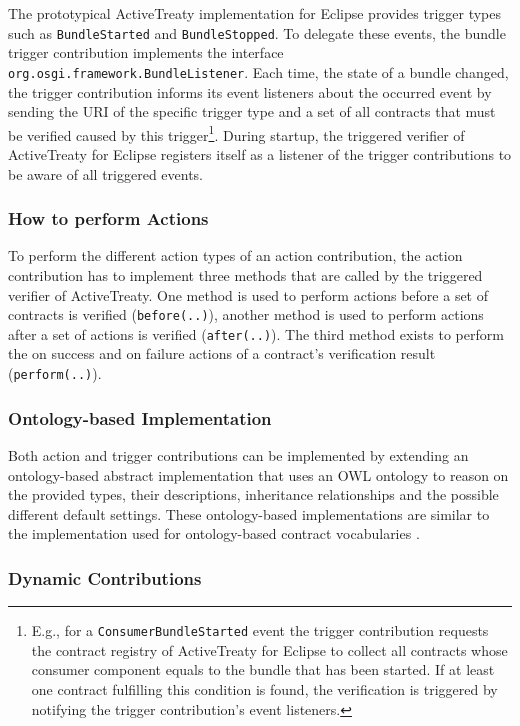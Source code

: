 \documentclass{llncs}
\begin{document}
The prototypical ActiveTreaty implementation for Eclipse provides trigger types such as \texttt{BundleStarted} and \texttt{BundleStopped}. To delegate these events, the bundle trigger contribution implements the interface \texttt{org.osgi.framework.Bun\-dle\-Lis\-te\-ner}. Each time, the state of a bundle changed, the trigger contribution informs its event listeners about the occurred event by sending the URI of the specific trigger type and a set of all contracts that must be verified caused by this trigger\footnote{E.g., for a \texttt{ConsumerBundleStarted} event the trigger contribution requests the contract registry of ActiveTreaty for Eclipse to collect all contracts whose consumer component equals to the bundle that has been started. If at least one contract fulfilling this condition is found, the verification is triggered by notifying the trigger contribution's event listeners.}. During startup, the triggered verifier of ActiveTreaty for Eclipse registers itself as a listener of the trigger contributions to be aware of all triggered events.

\subsubsection{How to perform Actions}

To perform the different action types of an action contribution, the action contribution has to implement three methods that are called by the triggered verifier of ActiveTreaty. One method is used to perform actions before a set of contracts is verified (\texttt{before(..)}), another method is used to perform actions after a set of actions is verified (\texttt{after(..)}). The third method exists to perform the on success and on failure actions of a contract's verification result (\texttt{perform(..)}).

\subsubsection{Ontology-based Implementation}

Both action and trigger contributions can be implemented by extending an ontology-based abstract implementation that uses an OWL ontology to reason on the provided types, their descriptions, inheritance relationships and the possible different default settings. These ontology-based implementations are similar to the implementation used for ontology-based contract vocabularies \cite{Treaty.JOT2009}.

\subsubsection{Dynamic Contributions}
\end{document}
